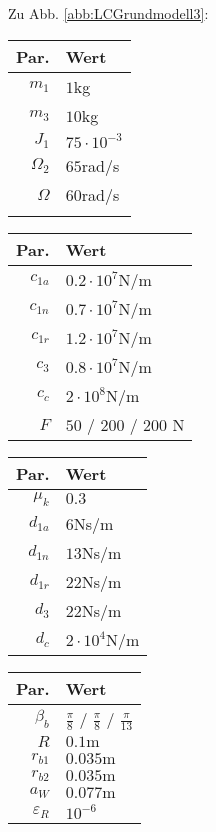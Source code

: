 Zu Abb. \ref{abb:LCGrundmodell3}:
\begin{center}
\begin{tabular}{r|l}
Par. &Wert\\\hline
$m_1$&$1$kg\\
$m_3$&$10$kg\\
$J_1$& $75\cdot10^{-3}$\\
$\Omega_2$&$65$rad/s\\
$\Omega$&$60$rad/s\\
&
\end{tabular} \hfill
\begin{tabular}{r|l}
Par. &Wert\\\hline
$c_{1a}$&$0.2\cdot10^{7}$N/m\\
$c_{1n}$&$0.7\cdot10^{7}$N/m \\
$c_{1r}$ & $1.2\cdot10^{7}$N/m\\
$c_{3}$ & $0.8\cdot10^{7}$N/m\\
$c_{c}$ & $2\cdot10^{8}$N/m\\
$F$&$50$ / $200$ / $200$ N\\
\end{tabular} \hfill
\begin{tabular}{r|l}
Par. &Wert\\\hline
$\mu_k$& $0.3$\\
$d_{1a}$&$6$Ns/m\\
$d_{1n}$&$13$Ns/m \\
$d_{1r}$ &$22$Ns/m\\
$d_{3}$ & $22$Ns/m\\
$d_{c}$ & $2\cdot10^{4}$N/m
\end{tabular} \hfill
\begin{tabular}{r|l}
Par. &Wert\\\hline
$\beta_b$& $\frac{\pi}{8}$ / $\frac{\pi}{8}$ / $\frac{\pi}{13}$ \\
$R$&$0.1\textrm{m}$ \\
$r_{b1}$&$ 0.035\textrm{m}$\\
$r_{b2}$&$ 0.035\textrm{m}$\\
$a_{W}$&$ 0.077\textrm{m}$\\
$\varepsilon_R$&$10^{-6}$
\end{tabular}
\end{center}

